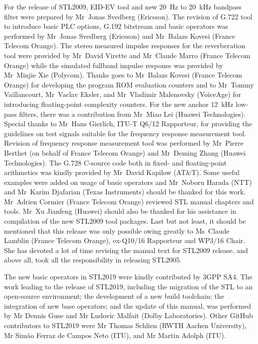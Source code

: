 For the release of STL2009, EID-EV tool and new 20~Hz to 20~kHz bandpass filter were prepared by Mr~Jonas Svedberg (Ericsson).
The revision of G.722 tool to introduce basic PLC options, G.192 bitstream and basic operators was performed by Mr~Jonas Svedberg (Ericsson) and Mr~Balazs Kovesi (France Telecom Orange).
The stereo measured impulse responses for the reverberation tool were provided by Mr~David Virette and Mr~Claude Marro (France Telecom Orange) while the simulated fullband impulse response was provided by Mr~Minjie Xie (Polycom).
Thanks goes to Mr~Balazs Kovesi (France Telecom Orange) for developing the program ROM evaluation counters and to Mr~Tommy Vaillancourt, Mr~Vaclav Eksler, and Mr~Vladimir Malenovsky (VoiceAge) for introducing floating-point complexity counters.
For the new anchor 12~kHz low-pass filters, there was a contribution from Mr~Miao Lei (Huawei Technologies).
Special thanks to Mr~Hans Gierlich, ITU-T Q6/12 Rapporteur, for providing the guidelines on test signals suitable for the frequency response measurement tool.
Revision of frequency response measurement tool was performed by Mr~Pierre Berthet (on behalf of France Telecom Orange) and Mr~Deming Zhang (Huawei Technologies).
The G.728 C-source code both in fixed- and floating-point arithmetics was kindly provided by Mr~David Kapilow (AT\&T).
Some useful examples were added on usage of basic operators and Mr~Noboru Harada (NTT) and Mr~Karim Djafarian (Texas Instruments) should be thanked for this work.
Mr~Adrien Cormier (France Telecom Orange) reviewed STL manual chapters and tools.
Mr~Xu Jianfeng (Huawei) should also be thanked for his assistance in compilation of the new STL2009 tool packages.
Last but not least, it should be mentioned that this release was only possible owing greatly to Ms~Claude Lamblin (France Telecom Orange), ex-Q10/16 Rapporteur and WP3/16 Chair.
She has devoted a lot of time revising the manual text for STL2009 release, and above all, took all the responsibility in releasing STL2005.

The new basic operators in STL2019 were kindly contributed by 3GPP SA4.
The work leading to the release of STL2019, including the migration of the STL to an open-source environment; the development of a new build toolchain; the integration of new base operators; and the update of this manual, was performed by Mr Dennis Guse and Mr Ludovic Malfait (Dolby Laboratories).
Other GitHub contributors to STL2019 were Mr Thomas Schlien (RWTH Aachen University), Mr Sim\~ao Ferraz de Campos Neto (ITU), and Mr Martin Adolph (ITU).

